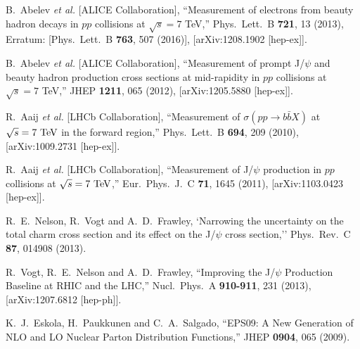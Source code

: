 \documentclass[12pt,a4paper,final]{iopart} %
\begin{document}
\begin{thebibliography}{100}
  B.~Abelev {\it et al.} [ALICE Collaboration],
  ``Measurement of electrons from beauty hadron decays in $pp$ collisions at $\sqrt{s}=7$ TeV,''
  Phys.\ Lett.\ B {\bf 721}, 13 (2013), Erratum: [Phys.\ Lett.\ B {\bf 763}, 507 (2016)],
  [arXiv:1208.1902 [hep-ex]].

  
  B.~Abelev {\it et al.} [ALICE Collaboration],
  ``Measurement of prompt J/$\psi$ and beauty hadron production cross sections at mid-rapidity in $pp$ collisions at $\sqrt{s} = 7$ TeV,''
  JHEP {\bf 1211}, 065 (2012),
  [arXiv:1205.5880 [hep-ex]].
  

  R.~Aaij {\it et al.} [LHCb Collaboration],
  ``Measurement of $\sigma(pp \to b \bar{b} X)$ at $\sqrt{s}=7~\rm{TeV}$ in the forward region,''
  Phys.\ Lett.\ B {\bf 694}, 209 (2010),
  [arXiv:1009.2731 [hep-ex]].
  
  R.~Aaij {\it et al.} [LHCb Collaboration],
  ``Measurement of J/$\psi$ production in $pp$ collisions at $\sqrt{s}=7~\rm{TeV}$,''
  Eur.\ Phys.\ J.\ C {\bf 71}, 1645 (2011),
  [arXiv:1103.0423 [hep-ex]].


  R.~E.~Nelson, R.~Vogt and A.~D.~Frawley,
  `Narrowing the uncertainty on the total charm cross section and its effect on the J/$\psi$ cross section,''
  Phys.\ Rev.\ C {\bf 87}, 014908 (2013).

  R.~Vogt, R.~E.~Nelson and A.~D.~Frawley,
  ``Improving the J/$\psi$ Production Baseline at RHIC and the LHC,''
  Nucl.\ Phys.\ A {\bf 910-911}, 231 (2013),
  [arXiv:1207.6812 [hep-ph]].


  K.~J.~Eskola, H.~Paukkunen and C.~A.~Salgado,
  ``EPS09: A New Generation of NLO and LO Nuclear Parton Distribution Functions,''
  JHEP {\bf 0904}, 065 (2009).





\end{thebibliography}
\end{document}
